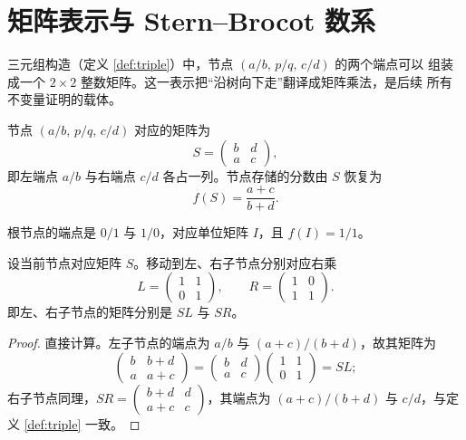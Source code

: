 \section{矩阵表示与 Stern--Brocot 数系}\label{sec:matrix}

三元组构造（定义 \ref{def:triple}）中，节点 $(a/b,\,p/q,\,c/d)$ 的两个端点可以
组装成一个 $2\times2$ 整数矩阵。这一表示把``沿树向下走''翻译成矩阵乘法，是后续
所有不变量证明的载体。

\begin{definition}[节点的矩阵]
节点 $(a/b,\,p/q,\,c/d)$ 对应的矩阵为
\[
  S=\begin{pmatrix}b&d\\ a&c\end{pmatrix},
\]
即左端点 $a/b$ 与右端点 $c/d$ 各占一列。节点存储的分数由 $S$ 恢复为
\[
  f(S)=\frac{a+c}{b+d}.
\]
\end{definition}

根节点的端点是 $0/1$ 与 $1/0$，对应单位矩阵 $I$，且 $f(I)=1/1$。

\begin{proposition}[左右移动对应矩阵乘法]\label{prop:LR}
设当前节点对应矩阵 $S$。移动到左、右子节点分别对应右乘
\[
  L=\begin{pmatrix}1&1\\0&1\end{pmatrix},
  \qquad
  R=\begin{pmatrix}1&0\\1&1\end{pmatrix}.
\]
即左、右子节点的矩阵分别是 $SL$ 与 $SR$。
\end{proposition}

\begin{proof}
直接计算。左子节点的端点为 $a/b$ 与 $(a+c)/(b+d)$，故其矩阵为
\[
  \begin{pmatrix}b&b+d\\ a&a+c\end{pmatrix}
  =\begin{pmatrix}b&d\\ a&c\end{pmatrix}
   \begin{pmatrix}1&1\\0&1\end{pmatrix}=SL;
\]
右子节点同理，$SR=\begin{pmatrix}b+d&d\\ a+c&c\end{pmatrix}$，其端点为
$(a+c)/(b+d)$ 与 $c/d$，与定义 \ref{def:triple} 一致。
\end{proof}


